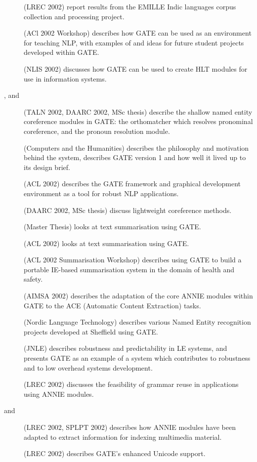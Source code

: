 \begin{description}

\item[\cite{McE02}] (LREC 2002)
report results from the EMILLE Indic languages corpus collection and
processing project.
%
\item[\cite{Bon02d}] (ACl 2002 Workshop)
describes how GATE can be used as an environment for teaching NLP,
with examples of and ideas for future student projects developed
within GATE.
%
\item[\cite{Bon02a}] (NLIS 2002)
discusses how GATE can be used to create HLT modules for use in information
systems.

\item[\cite{Bon02c}, \cite{Dim02a} and \cite{Dimitrov02}]
(TALN 2002, DAARC 2002, MSc thesis)
describe the shallow named entity coreference modules in GATE:
the orthomatcher which resolves pronominal coreference,
and the pronoun resolution module.
%
\item[\cite{Cun01b}] (Computers and the Humanities)
describes the philosophy and motivation behind the system, describes GATE
version 1 and how well it lived up to its design brief.
%
\item[\cite{Cun02b}] (ACL 2002)
describes the GATE framework and graphical development environment as a
tool for robust NLP applications.

\item[\cite{Dim02a,Dimitrov02b}] (DAARC 2002, MSc thesis) discuss
lightweight coreference methods.
%
\item[\cite{Lal02a}] (Master Thesis) looks at text summarisation using GATE.
%
\item[\cite{Lal02b}] (ACL 2002) looks at text summarisation using GATE.
%
\item[\cite{May02e}] (ACL 2002 Summarisation Workshop)
describes using GATE to build a portable IE-based summarisation system
in the domain of health and safety.
%
\item[\cite{May02b}] (AIMSA 2002)
describes the adaptation of the core ANNIE modules within GATE to the ACE
(Automatic Content Extraction) tasks.

\item[\cite{May02d}] (Nordic Language Technology)
describes various Named Entity recognition projects developed at Sheffield
using GATE.
%
\item[\cite{May02a}] (JNLE)
describes robustness and predictability in LE systems, and presents
GATE as an example of a system which contributes to robustness and to
low overhead systems development.
%
\item[\cite{Pastra02}] (LREC 2002)
discusses the feasibility of grammar reuse in applications using ANNIE modules.
%
\item[\cite{Saggion02} and \cite{Saggion&al2002b}] (LREC 2002, SPLPT 2002)
describes how ANNIE modules have been adapted to extract information for
indexing multimedia material.
%
\item[\cite{Tablan02}] (LREC 2002)
describes GATE's enhanced Unicode support.
%
\end{description}

